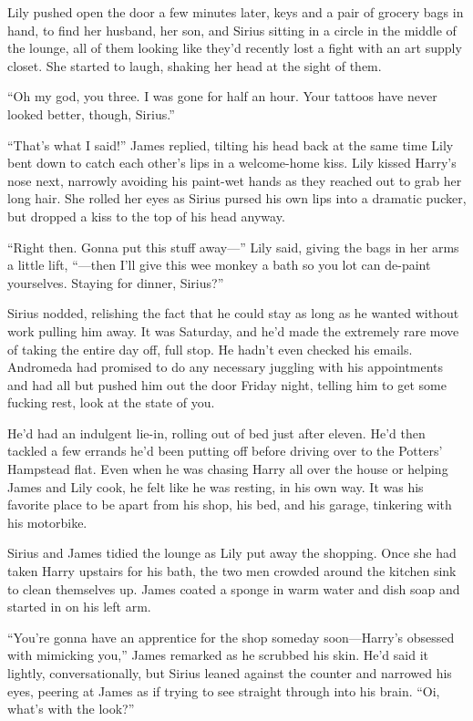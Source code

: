 Lily pushed open the door a few minutes later, keys and a pair of grocery bags in hand, to find her husband, her son, and Sirius sitting in a circle in the middle of the lounge, all of them looking like they’d recently lost a fight with an art supply closet. She started to laugh, shaking her head at the sight of them.

“Oh my god, you three. I was gone for half an hour. Your tattoos have never looked better, though, Sirius.”

“That’s what I said!” James replied, tilting his head back at the same time Lily bent down to catch each other’s lips in a welcome-home kiss. Lily kissed Harry’s nose next, narrowly avoiding his paint-wet hands as they reached out to grab her long hair. She rolled her eyes as Sirius pursed his own lips into a dramatic pucker, but dropped a kiss to the top of his head anyway.

“Right then. Gonna put this stuff away—” Lily said, giving the bags in her arms a little lift, “—then I’ll give this wee monkey a bath so you lot can de-paint yourselves. Staying for dinner, Sirius?”

Sirius nodded, relishing the fact that he could stay as long as he wanted without work pulling him away. It was Saturday, and he’d made the extremely rare move of taking the entire day off, full stop. He hadn’t even checked his emails. Andromeda had promised to do any necessary juggling with his appointments and had all but pushed him out the door Friday night, telling him to get some fucking rest, look at the state of you.

He’d had an indulgent lie-in, rolling out of bed just after eleven. He’d then tackled a few errands he’d been putting off before driving over to the Potters’ Hampstead flat. Even when he was chasing Harry all over the house or helping James and Lily cook, he felt like he was resting, in his own way. It was his favorite place to be apart from his shop, his bed, and his garage, tinkering with his motorbike.

Sirius and James tidied the lounge as Lily put away the shopping. Once she had taken Harry upstairs for his bath, the two men crowded around the kitchen sink to clean themselves up. James coated a sponge in warm water and dish soap and started in on his left arm.

“You’re gonna have an apprentice for the shop someday soon—Harry’s obsessed with mimicking you,” James remarked as he scrubbed his skin. He’d said it lightly, conversationally, but Sirius leaned against the counter and narrowed his eyes, peering at James as if trying to see straight through into his brain. “Oi, what’s with the look?”

